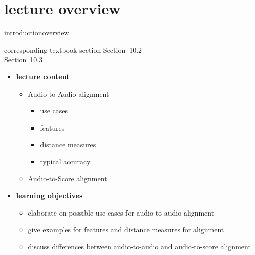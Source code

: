 


\subtitle{Module 10.2: Audio-to-Audio \& Audio-to-Score Alignment}


	

    \section[overview]{lecture overview}
        \begin{frame}{introduction}{overview}
            \begin{block}{corresponding textbook section}
                    Section~10.2\\
                    Section~10.3
            \end{block}

            \begin{itemize}
                \item   \textbf{lecture content}
                    \begin{itemize}
                        \item   Audio-to-Audio alignment
                            \begin{itemize}
                                \item   use cases
                                \item   features
                                \item   distance measures
                                \item   typical accuracy
                            \end{itemize}
                        \item   Audio-to-Score alignment
                    \end{itemize}
                \bigskip
                \item<2->   \textbf{learning objectives}
                    \begin{itemize}
                        \item   elaborate on possible use cases for audio-to-audio alignment
                        \item   give examples for features and distance measures for alignment
                        \item   discuss differences between audio-to-audio and audio-to-score alignment
                    \end{itemize}
            \end{itemize}
        \end{frame}

